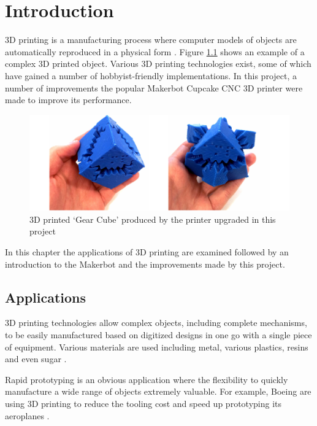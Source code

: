 \chapter{Introduction}
	
	
	3D printing is a manufacturing process where computer models of objects are
	automatically reproduced in a physical form \cite{additivemanufacturing}.
	Figure \ref{fig:gearCube} shows an example of a complex 3D printed object.
	Various 3D printing technologies exist, some of which have gained a number of
	hobbyist-friendly implementations. In this project, a number of improvements
	the popular Makerbot Cupcake CNC 3D printer were made to improve its
	performance.
	
	\begin{figure}
		\includegraphics[width=1\textwidth]{diagrams/gearCube.pdf}
		\caption{3D printed `Gear Cube' produced by the printer upgraded in this
		project}
		\label{fig:gearCube}
	\end{figure}
	
	In this chapter the applications of 3D printing are examined followed by an
	introduction to the Makerbot and the improvements made by this project.
	
	\section{Applications}
		
		3D printing technologies allow complex objects, including complete
		mechanisms, to be easily manufactured based on digitized designs in one go
		with a single piece of equipment. Various materials are used including
		metal, various plastics, resins and even sugar \cite{candyfab}.
		
		Rapid prototyping is an obvious application where the flexibility to quickly
		manufacture a wide range of objects extremely valuable. For example, Boeing
		are using 3D printing to reduce the tooling cost and speed up prototyping
		its aeroplanes \cite{boeing3dprint}.
		
